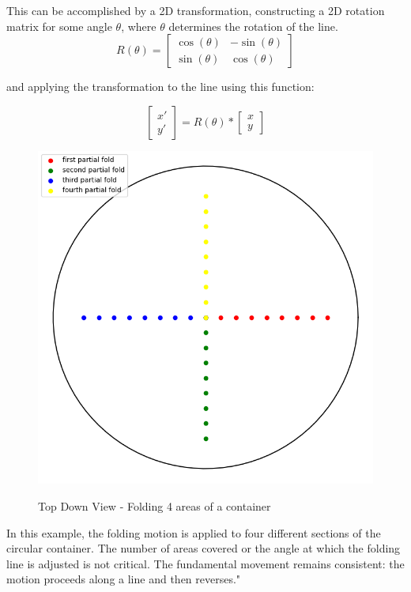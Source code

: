 This can be accomplished by a 2D transformation, constructing a 2D rotation matrix for some angle $\theta$, where $\theta$ determines the rotation of the line.
\[R(\theta) = \begin{bmatrix}
    \cos(\theta) & -\sin(\theta) \\
    \sin(\theta) & \cos(\theta)
     \end{bmatrix}
 \] 

and applying the transformation to the line using this function:

\[\begin{bmatrix} x' \\ y' \end{bmatrix} = R(\theta) * \begin{bmatrix} x \\ y \end{bmatrix}\]

\begin{figure}[H]
    \includegraphics[scale=0.35]{Graphics/motions/folding0.png}
    \centering
    \label{fig:foldingMotion1}
    \caption{Top Down View - Folding 4 areas of a container}
\end{figure}

In this example, the folding motion is applied to four different sections of the circular container.
The number of areas covered or the angle at which the folding line is adjusted is not critical.
The fundamental movement remains consistent: the motion proceeds along a line and then reverses."

